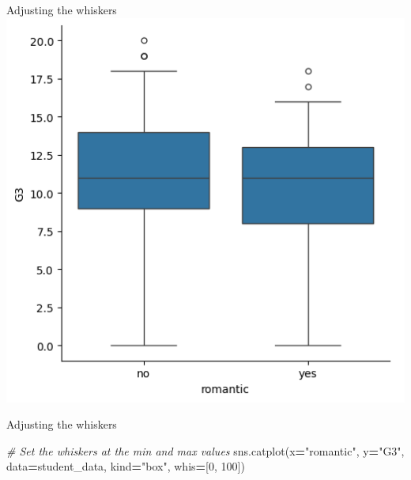 \documentclass[
  ignorenonframetext,
]{beamer}
\newenvironment{Shaded}{\begin{snugshade}}{\end{snugshade}}
\newcommand{\CommentTok}[1]{\textcolor[rgb]{0.56,0.35,0.01}{\textit{#1}}}
\newcommand{\DecValTok}[1]{\textcolor[rgb]{0.00,0.00,0.81}{#1}}
\newcommand{\NormalTok}[1]{#1}
\newcommand{\OperatorTok}[1]{\textcolor[rgb]{0.81,0.36,0.00}{\textbf{#1}}}
\newcommand{\StringTok}[1]{\textcolor[rgb]{0.31,0.60,0.02}{#1}}
\begin{document}
\begin{frame}{Adjusting the whiskers}
\label{adjusting-the-whiskers-6}
\includegraphics{../images/im288.png}
\end{frame}

\begin{frame}[fragile]{Adjusting the whiskers}
\label{adjusting-the-whiskers-7}

\begin{Shaded}
\begin{Highlighting}[]
\CommentTok{\# Set the whiskers at the min and max values}
\NormalTok{sns.catplot(x}\OperatorTok{=}\StringTok{"romantic"}\NormalTok{, y}\OperatorTok{=}\StringTok{"G3"}\NormalTok{,}
\NormalTok{            data}\OperatorTok{=}\NormalTok{student\_data,}
\NormalTok{            kind}\OperatorTok{=}\StringTok{"box"}\NormalTok{,}
\NormalTok{            whis}\OperatorTok{=}\NormalTok{[}\DecValTok{0}\NormalTok{, }\DecValTok{100}\NormalTok{])}
\end{Highlighting}
\end{Shaded}
\end{frame}
\end{document}

